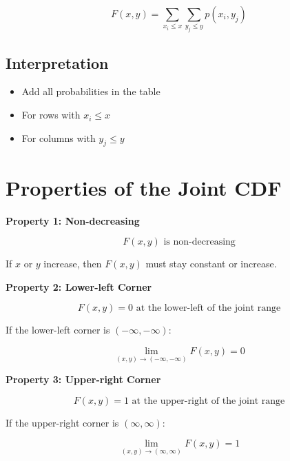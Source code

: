 \documentclass[12pt]{article}
\begin{document}
\[
F(x,y) = \sum_{x_i \le x} \sum_{y_j \le y} p(x_i, y_j)
\]

\subsection{Interpretation}

\begin{itemize}
\item Add all probabilities in the table
\item For rows with $x_i \le x$
\item For columns with $y_j \le y$
\end{itemize}

\section{Properties of the Joint CDF}

\textbf{Property 1: Non-decreasing}

\[
F(x,y) \text{ is non-decreasing}
\]

If $x$ or $y$ increase, then $F(x,y)$ must stay constant or increase.

\textbf{Property 2: Lower-left Corner}

\[
F(x,y) = 0 \text{ at the lower-left of the joint range}
\]

If the lower-left corner is $(-\infty, -\infty)$:

\[
\lim_{(x,y)\to(-\infty,-\infty)} F(x,y) = 0
\]

\textbf{Property 3: Upper-right Corner}

\[
F(x,y) = 1 \text{ at the upper-right of the joint range}
\]

If the upper-right corner is $(\infty, \infty)$:

\[
\lim_{(x,y)\to(\infty,\infty)} F(x,y) = 1
\]
\end{document}
